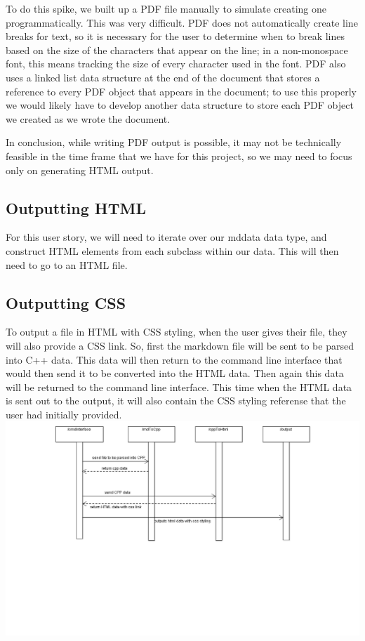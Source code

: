 To do this spike, we built up a PDF file manually to simulate creating one programmatically. This was very difficult. PDF does not automatically create line breaks for text, so it is necessary for the user to determine when to break lines based on the size of the characters that appear on the line; in a non-monospace font, this means tracking the size of every character used in the font. PDF also uses a linked list data structure at the end of the document that stores a reference to every PDF object that appears in the document; to use this properly we would likely have to develop another data structure to store each PDF object we created as we wrote the document.

In conclusion, while writing PDF output is possible, it may not be technically feasible in the time frame that we have for this project, so we may need to focus only on generating HTML output.

\subsection{Outputting HTML}
For this user story, we will need to iterate over our mddata data type, and construct HTML elements from each subclass within our data. This will then need to go to an HTML file.

\subsection{Outputting CSS}
To output a file in HTML with CSS styling, when the user gives their file, they will also provide a CSS link. So, first the markdown file will be sent to be parsed into C++ data. This data will then return to the command line interface that would then send it to be converted into the HTML data. Then again this data will be returned to the command line interface. This time when the HTML data is sent out to the output, it will also contain the CSS styling referense that the user had initially provided.  
\hspace{-5cm}\includegraphics[width=700pt]{images/Output.png}

